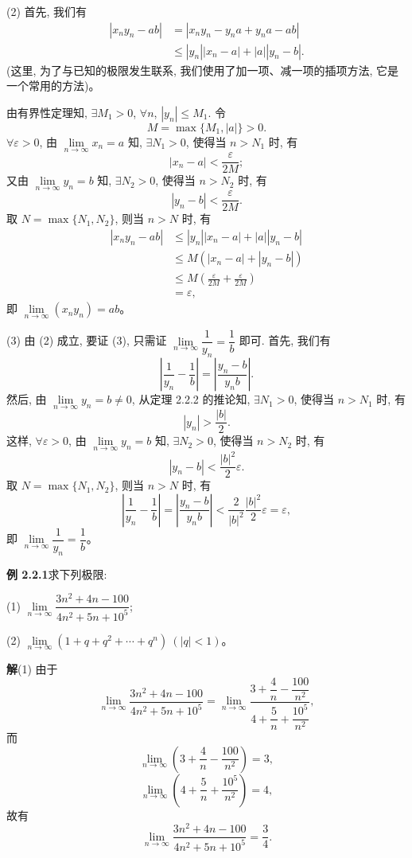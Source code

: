 \documentclass[UTF8,12pt,a4paper,fontset=fandol]{ctexart}
\begin{document}
(2) 首先, 我们有
\[
\begin{aligned}
  |x_ny_n-ab|
  &=|x_ny_n-y_na+y_na-ab|\\
  &\leqslant |y_n||x_n-a|+|a||y_n-b|.
\end{aligned}
\]
(这里, 为了与已知的极限发生联系, 我们使用了加一项、减一项的插项方法, 它是一个常用的方法)。

由有界性定理知, $\exists M_1>0$, $\forall n$, $|y_n|\leqslant M_1$. 令
\[
  M=\max\{M_1,|a|\}>0.
\]
$\forall\varepsilon>0$, 由 $\lim\limits_{n\to\infty}x_n=a$ 知, $\exists N_1>0$, 使得当 $n>N_1$ 时, 有
\[
  |x_n-a|<\frac{\varepsilon}{2M};
\]
又由 $\lim\limits_{n\to\infty}y_n=b$ 知, $\exists N_2>0$, 使得当 $n>N_2$ 时, 有
\[
  |y_n-b|<\frac{\varepsilon}{2M}.
\]
取 $N=\max\{N_1,N_2\}$, 则当 $n>N$ 时, 有
\[
\begin{aligned}
  |x_ny_n-ab|
  &\leqslant |y_n||x_n-a|+|a||y_n-b|\\
  &\leqslant M(|x_n-a|+|y_n-b|)\\
  &\leqslant M\left(\frac{\varepsilon}{2M}+\frac{\varepsilon}{2M}\right)\\
  &=\varepsilon,
\end{aligned}
\]
即 $\lim\limits_{n\to\infty}(x_ny_n)=ab$。

(3) 由 (2) 成立, 要证 (3), 只需证 $\lim\limits_{n\to\infty}\dfrac1{y_n}=\dfrac1b$ 即可. 首先, 我们有
\[
  \left|\frac1{y_n}-\frac1b\right|
  =
  \left|\frac{y_n-b}{y_nb}\right|.
\]
然后, 由 $\lim\limits_{n\to\infty}y_n=b\ne0$, 从定理 2.2.2 的推论知, $\exists N_1>0$, 使得当 $n>N_1$ 时, 有
\[
  |y_n|>\frac{|b|}{2}.
\]
这样, $\forall\varepsilon>0$, 由 $\lim\limits_{n\to\infty}y_n=b$ 知, $\exists N_2>0$, 使得当 $n>N_2$ 时, 有
\[
  |y_n-b|<\frac{|b|^2}{2}\varepsilon.
\]
取 $N=\max\{N_1,N_2\}$, 则当 $n>N$ 时, 有
\[
  \left|\frac1{y_n}-\frac1b\right|
  =
  \left|\frac{y_n-b}{y_nb}\right|
  <
  \frac2{|b|^2}\frac{|b|^2}{2}\varepsilon
  =
  \varepsilon,
\]
即 $\lim\limits_{n\to\infty}\dfrac1{y_n}=\dfrac1b$。

\noindent\textbf{例 2.2.1}\quad 求下列极限:

(1) $\lim\limits_{n\to\infty}\dfrac{3n^2+4n-100}{4n^2+5n+10^5}$;

(2) $\lim\limits_{n\to\infty}(1+q+q^2+\cdots+q^n)\ (|q|<1)$。

\noindent\textbf{解}\quad (1) 由于
\[
  \lim_{n\to\infty}\frac{3n^2+4n-100}{4n^2+5n+10^5}
  =
  \lim_{n\to\infty}
  \frac{3+\dfrac4n-\dfrac{100}{n^2}}
       {4+\dfrac5n+\dfrac{10^5}{n^2}},
\]
而
\[
  \lim_{n\to\infty}\left(3+\frac4n-\frac{100}{n^2}\right)=3,
\]
\[
  \lim_{n\to\infty}\left(4+\frac5n+\frac{10^5}{n^2}\right)=4,
\]
故有
\[
  \lim_{n\to\infty}\frac{3n^2+4n-100}{4n^2+5n+10^5}=\frac34.
\]
\end{document}
